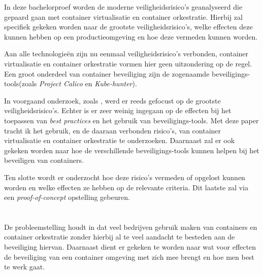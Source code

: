In deze bachelorproef worden de moderne veiligheidsrisico’s geanalyseerd die gepaard gaan met container virtualisatie en container orkestratie. Hierbij zal specifiek gekeken worden naar de grootste veiligheidsrisico’s, welke effecten deze kunnen hebben op een productieomgeving en hoe deze vermeden kunnen worden.

Aan alle technologieën zijn nu eenmaal veiligheidsrisico’s verbonden, container virtualisatie en container orkestratie vormen hier geen uitzondering op de regel. Een groot onderdeel van container beveiliging zijn de zogenaamde beveiligings-tools(zoals \textit{Project Calico} en \textit{Kube-hunter}).

In voorgaand onderzoek, zoals \autocite{Shamim2020}, werd er reeds gefocust op de grootste veiligheidsrisico's. Echter is er zeer weinig ingegaan op de effecten bij het toepassen van \textit{best practices} en het gebruik van  beveiligings-tools. Met deze paper tracht ik het gebruik, en de daaraan verbonden risico’s, van container virtualisatie en container orkestratie te onderzoeken. Daarnaast zal er ook gekeken worden naar hoe de verschillende beveiligings-tools kunnen helpen bij het beveiligen van containers.

Ten slotte wordt er onderzocht hoe deze risico’s vermeden of opgelost kunnen worden en welke effecten ze hebben op de relevante criteria. Dit laatste zal via een \textit{proof-of-concept} opstelling gebeuren.

\section{}
\label{sec:probleemstelling}

De probleemstelling houdt in dat veel bedrijven gebruik maken van containers en container orkestratie zonder hierbij al te veel aandacht te besteden aan de beveiliging hiervan. Daarnaast dient er gekeken te worden naar wat voor effecten de beveiliging van een container omgeving met zich mee brengt en hoe men best te werk gaat.


